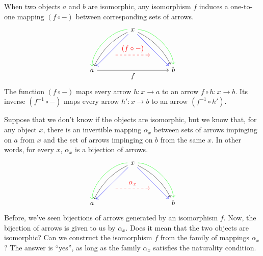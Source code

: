 \documentclass[DaoFP]{subfiles}
\begin{document}
When two objects $a$ and $b$ are isomorphic, any isomorphism $f$ induces a one-to-one mapping $(f \circ -)$ between corresponding sets of arrows.  
\[
 \begin{tikzcd}
 \node(x) at (0, 2) {x};
 \node(a) at (-2, 0) {a};
 \node(b) at (2, 0) {b};
 \node(c1) at (-1, 1.5) {};
 \node(c2) at (-1.5, 1) {};
 \node(c3) at (-1, 2) {};
 \node(c4) at (-2, 1) {};
 \node(d1) at (1, 1.5) {};
 \node(d2) at (1.5, 1) {};
 \node(d3) at (1, 2) {};
 \node(d4) at (2, 1) {};
\node (aa) at (-1, 0.75) {};
 \node (bb) at (1, 0.75) {};
 \draw[->] (x) .. controls (c1)  and (c2) .. (a); %
 \draw[->, green] (x) .. controls (c3)  and (c4) .. (a); %
 \draw[->, blue] (x) -- (a); 
  \draw[->] (x) .. controls (d1)  and (d2) .. (b); %
 \draw[->, green] (x) .. controls (d3)  and (d4) .. (b); %
 \draw[->, blue] (x) -- (b); 
 \draw[->, red, dashed] (aa) -- node[above]{(f \circ -)} (bb);
\draw[->] (a) -- node[below]{f} (b);
 \end{tikzcd}
\]
The function $(f \circ -)$ maps every arrow $h \colon x \to a$ to an arrow $f \circ h \colon x \to b$. Its inverse $(f^{-1} \circ -)$ maps every arrow $h' \colon x \to b$ to an arrow $(f^{-1} \circ h')$.


Suppose that we don't know if the objects are isomorphic, but we know that, for any object $x$,  there is an invertible mapping $\alpha_x$ between sets of arrows impinging on $a$ from $x$ and the set of arrows impinging on $b$ from the same $x$. In other words, for every $x$, $\alpha_x$ is a bijection of arrows. 
\[
 \begin{tikzcd}
 \node(x) at (0, 2) {x};
 \node(a) at (-2, 0) {a};
 \node(b) at (2, 0) {b};
 \node(c1) at (-1, 1.5) {};
 \node(c2) at (-1.5, 1) {};
 \node(c3) at (-1, 2) {};
 \node(c4) at (-2, 1) {};
 \node(d1) at (1, 1.5) {};
 \node(d2) at (1.5, 1) {};
 \node(d3) at (1, 2) {};
 \node(d4) at (2, 1) {};
\node (aa) at (-1, 0.75) {};
 \node (bb) at (1, 0.75) {};
 \draw[->] (x) .. controls (c1)  and (c2) .. (a); %
 \draw[->, green] (x) .. controls (c3)  and (c4) .. (a); %
 \draw[->, blue] (x) -- (a); 
  \draw[->] (x) .. controls (d1)  and (d2) .. (b); %
 \draw[->, green] (x) .. controls (d3)  and (d4) .. (b); %
 \draw[->, blue] (x) -- (b); 
 \draw[->, red, dashed] (aa) -- node[above]{\alpha_x} (bb);
 \end{tikzcd}
\]
Before, we've seen bijections of arrows generated by an isomorphism $f$. Now, the bijection of arrows is given to us by $\alpha_x$. Does it mean that the two objects are isomorphic? Can we construct the isomorphism $f$ from the family of mappings $\alpha_x$? The answer is ``yes'', as long as the family $\alpha_x$ satisfies the naturality condition.
\end{document}
